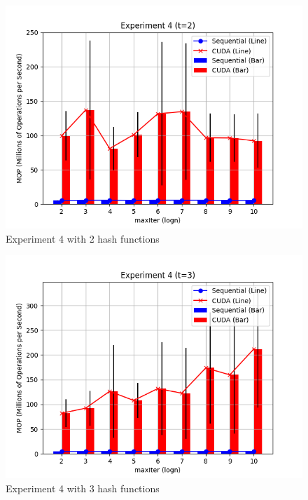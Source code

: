 \documentclass{article}
\begin{document}
\begin{figure}[h!]
    \centering
    \includegraphics[width=\textwidth]{../figs/experiment4_t2.png}
    \caption{Experiment 4 with 2 hash functions}
\end{figure}

\begin{figure}[h!]
    \centering
    \includegraphics[width=\textwidth]{../figs/experiment4_t3.png}
    \caption{Experiment 4 with 3 hash functions}
\end{figure}
\end{document}
